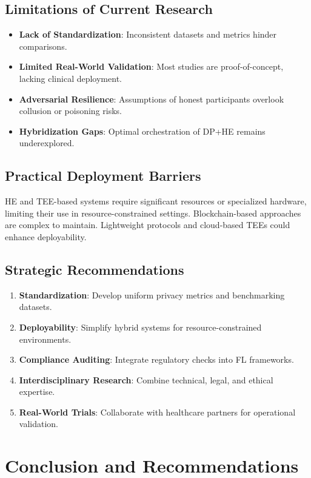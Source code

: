 \documentclass[12pt]{report}
\begin{document}
\section{Limitations of Current Research}
\begin{itemize}
    \item \textbf{Lack of Standardization}: Inconsistent datasets and metrics hinder comparisons.
    \item \textbf{Limited Real-World Validation}: Most studies are proof-of-concept, lacking clinical deployment.
    \item \textbf{Adversarial Resilience}: Assumptions of honest participants overlook collusion or poisoning risks.
    \item \textbf{Hybridization Gaps}: Optimal orchestration of DP+HE remains underexplored.
\end{itemize}

\section{Practical Deployment Barriers}
HE and TEE-based systems require significant resources or specialized hardware, limiting their use in resource-constrained settings. Blockchain-based approaches are complex to maintain. Lightweight protocols and cloud-based TEEs could enhance deployability.

\section{Strategic Recommendations}
\begin{enumerate}
    \item \textbf{Standardization}: Develop uniform privacy metrics and benchmarking datasets.
    \item \textbf{Deployability}: Simplify hybrid systems for resource-constrained environments.
    \item \textbf{Compliance Auditing}: Integrate regulatory checks into FL frameworks.
    \item \textbf{Interdisciplinary Research}: Combine technical, legal, and ethical expertise.
    \item \textbf{Real-World Trials}: Collaborate with healthcare partners for operational validation.
\end{enumerate}

\chapter{Conclusion and Recommendations}
\end{document}
